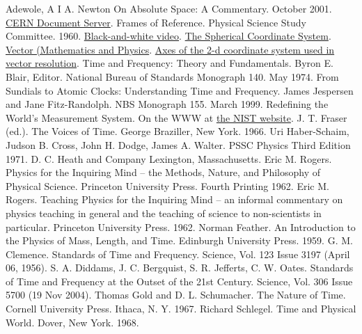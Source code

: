 \documentclass[12pt,a4paper]{book}
\newcounter{solution}[chapter] %
\begin{document}
\begin{thebibliography}{00}
     Adewole, A I A. Newton On Absolute Space: A Commentary. October 2001. \href{https://cds.cern.ch/record/523046}{CERN Document Server}.
     Frames of Reference. Physical Science Study Committee. 1960. \href{https://archive.org/details/FramesOfReference_201407}{Black-and-white video}.
     \href{https://en.wikipedia.org/wiki/Spherical_coordinate_system}{The Spherical Coordinate System}.
     \href{https://en.wikipedia.org/wiki/Vector_(mathematics_and_physics)}{Vector (Mathematics and Physics}.
      \href{https://www.physicsforums.com/threads/axes-of-the-2-d-coordinate-system-used-in-vector-resolution.1001481/}{Axes of the 2-d coordinate system used in vector resolution}.
     Time and Frequency: Theory and Fundamentals. Byron E. Blair, Editor. National Bureau of Standards Monograph 140. May 1974.
     From Sundials to Atomic Clocks: Understanding Time and Frequency. James Jespersen and Jane Fitz-Randolph. NBS Monograph 155. March 1999.
     Redefining the World's Measurement System. On the WWW at \href{https://www.nist.gov/si-redefinition/turning-point-humanity-redefining-worlds-measurement-system}{the NIST website}.
     J. T. Fraser (ed.). The Voices of Time. George Braziller, New York. 1966.
     Uri Haber-Schaim, Judson B. Cross, John H. Dodge, James A. Walter. PSSC Physics Third Edition 1971. D. C. Heath and Company Lexington, Massachusetts.
     Eric M. Rogers. Physics for the Inquiring Mind -- the Methods, Nature, and Philosophy of Physical Science. Princeton University Press. Fourth Printing 1962.
     Eric M. Rogers. Teaching Physics for the Inquiring Mind -- an informal commentary on physics teaching in general and the teaching of science to non-scientists in particular. Princeton University Press. 1962. 
     Norman Feather. An Introduction to the Physics of Mass, Length, and Time. Edinburgh University Press. 1959.
     G. M. Clemence. Standards of Time and Frequency. Science, Vol. 123 Issue 3197 (April 06, 1956).
     S. A. Diddams, J. C. Bergquist, S. R. Jefferts, C. W. Oates. Standards of Time and Frequency at the Outset of the 21st Century. Science, Vol. 306 Issue 5700 (19 Nov 2004).
     Thomas Gold and D. L. Schumacher. The Nature of Time. Cornell University Press. Ithaca, N. Y. 1967.
     Richard Schlegel. Time and Physical World. Dover, New York. 1968.
\end{thebibliography}
\end{document}
